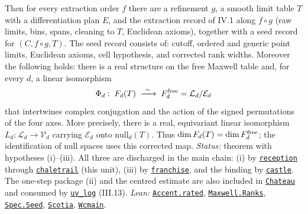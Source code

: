 \documentclass[
  letterpaper,
  11pt]{article}
\begin{document}
Then for every extraction order \(f\) there are a refinement \(g\), a
smooth limit table \(T\) with a differentiation plan \(E\), and the
extraction record of IV.1 along \(f\circ g\) (raw limits, bins, spans,
cleaning to \(T\), Euclidean axioms), together with a seed record for
\((C,f\circ g,T)\). The seed record consists of: cutoff, ordered and
generic point limits, Euclidean axioms, cell hypothesis, and corrected
rank widths. Moreover the following holds: there is a real structure on
the free Maxwell table and, for every \(d\), a linear isomorphism
\[\Phi_d:\;F_d(T)\;\xrightarrow{\ \sim\ }\;F_d^{\rm free}=\mathcal L_d/\mathcal E_d\]
that intertwines complex conjugation and the action of the signed
permutations of the four axes. More precisely, there is a real,
equivariant linear isomorphism \(L_d:\mathcal L_d\to\mathcal V_d\)
carrying \(\mathcal E_d\) onto \(\mathrm{null}_d(T)\). Thus
\(\dim F_d(T)=\dim F_d^{\rm free}\); the identification of null spaces
uses this corrected map. \emph{Status:} theorem with hypotheses
(i)--(iii). All three are discharged in the main chain: (i) by
\href{https://github.com/yang-mills-group/OpenAI-YM-20261028/blob/3456e5e75cf8d4cd558955a5c7638fba2d68f464/YM/MergeProof/Eureka.lean\#L22-L30}{\texttt{reception}}
through
\href{https://github.com/yang-mills-group/OpenAI-YM-20261028/blob/3456e5e75cf8d4cd558955a5c7638fba2d68f464/YM/MergeProof/Inns.lean\#L33-L53}{\texttt{chaletrail}}
(this unit), (iii) by
\href{https://github.com/yang-mills-group/OpenAI-YM-20261028/blob/3456e5e75cf8d4cd558955a5c7638fba2d68f464/YM/MergeProof/Snow.lean\#L55-L60}{\texttt{franchise}},
and the binding by
\href{https://github.com/yang-mills-group/OpenAI-YM-20261028/blob/3456e5e75cf8d4cd558955a5c7638fba2d68f464/YM/MergeProof/Snow.lean\#L28-L43}{\texttt{castle}}.
The one-step package (ii) and the centred estimate are also included in
\href{https://github.com/yang-mills-group/OpenAI-YM-20261028/blob/3456e5e75cf8d4cd558955a5c7638fba2d68f464/YM/MergeProof/Almandine.lean\#L24-L36}{\texttt{Chateau}}
and consumed by
\href{https://github.com/yang-mills-group/OpenAI-YM-20261028/blob/3456e5e75cf8d4cd558955a5c7638fba2d68f464/YM/SharpGram/Assembly/Flowers.lean\#L75-L130}{\texttt{uv\_log}}
(III.13). \emph{Lean:}
\href{https://github.com/yang-mills-group/OpenAI-YM-20261028/blob/3456e5e75cf8d4cd558955a5c7638fba2d68f464/YM/MergeProof/Powder.lean\#L48-L71}{\texttt{Accent.rated}},
\href{https://github.com/yang-mills-group/OpenAI-YM-20261028/blob/3456e5e75cf8d4cd558955a5c7638fba2d68f464/YM/Euclid/Comparator.lean\#L135-L139}{\texttt{Maxwell.Ranks}},
\href{https://github.com/yang-mills-group/OpenAI-YM-20261028/blob/3456e5e75cf8d4cd558955a5c7638fba2d68f464/YM/Spec/Closed.lean\#L20-L26}{\texttt{Spec.Seed}},
\href{https://github.com/yang-mills-group/OpenAI-YM-20261028/blob/3456e5e75cf8d4cd558955a5c7638fba2d68f464/YM/MergeProof/Eureka.lean\#L16-L20}{\texttt{Scotia}},
\href{https://github.com/yang-mills-group/OpenAI-YM-20261028/blob/3456e5e75cf8d4cd558955a5c7638fba2d68f464/YM/Extraction/Center.lean\#L38-L40}{\texttt{Wcmain}}.
\end{document}

